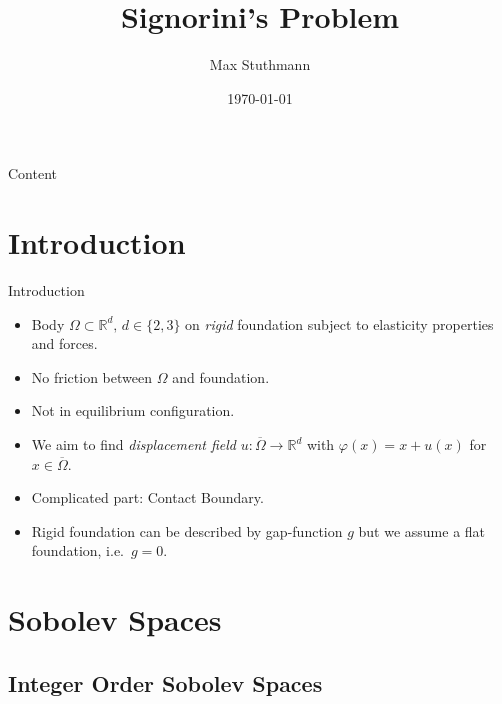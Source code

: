 \documentclass[10pt,aspectratio=169]{beamer}
\title{Signorini's Problem}
\author{Max Stuthmann}
\date{\tiny \today}
\def\R{{\mathbb R}}
\begin{document}
\begin{frame}[plain]
	\titlepage
\end{frame}

\begin{frame}{Content}
	\tableofcontents
\end{frame}

\section{Introduction}
\begin{frame}{Introduction}
	\begin{itemize}
		\item Body $\Omega\subset\R^d,\,d\in\{2,3\}$ on {\em rigid} foundation subject to elasticity properties and forces.
		\item No friction between $\Omega$ and foundation.
		\item Not in equilibrium configuration.
		\item We aim to find {\em displacement field} $u:\overline{\Omega}\to\R^d$ with $\varphi(x) = x+u(x)$ for $x\in\overline{\Omega}$.
		\item Complicated part: Contact Boundary.
		\item Rigid foundation can be described by gap-function $g$ but we assume a flat foundation, i.e.\ $g = 0$.
	\end{itemize}
	\begin{figure}[!h]
		\centering
		
	\end{figure}
\end{frame}

\section{Sobolev Spaces}

\subsection{Integer Order Sobolev Spaces}
\end{document}
